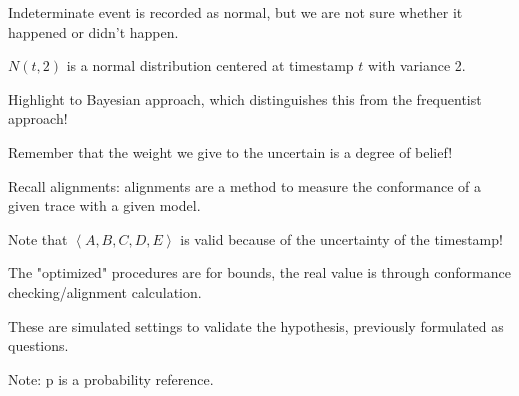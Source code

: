 
\nextslides[slide=4] 

\nextslides

\nextslides

\nextslides

\nextslides

\nextslides

Indeterminate event is recorded as normal, but we are not sure whether it happened or didn't happen.

\nextslides[until=11]

$N(t,2)$ is a normal distribution centered at timestamp $t$ with variance 2.

\nextslides

Highlight to Bayesian approach, which distinguishes this from the frequentist approach!

\nextslides

Remember that the weight we give to the uncertain is a degree of belief!

\nextslides[slide=15] 

\nextslides[until=18, highlight=16] 

Recall alignments: alignments are a method to measure the conformance of a given trace with a given model.

\nextslides

Note that $\left< A,B,C,D,E \right>$ is valid because of the uncertainty of the timestamp!

\nextslides

The "optimized" procedures are for bounds, the real value is through conformance checking/alignment calculation.

\nextslides

\nextslides

\nextslides

\nextslides[slide=27] 

\nextslides

\nextslides

\nextslides

\nextslides[until=34, highlight=33] 

These are simulated settings to validate the hypothesis, previously formulated as questions.

Note: p is a probability reference.

\nextslides[until=36, highlight=35] 

\nextslides[slide=38]

